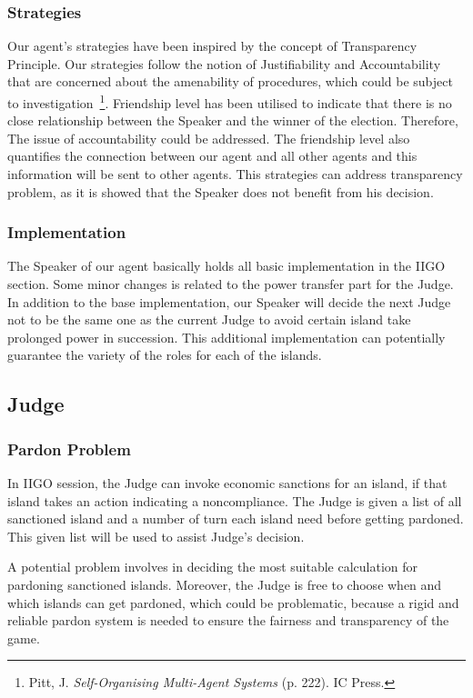 \subsubsection{Strategies} \label{subsubsec:Team6_Speaker:Strategies}
Our agent's strategies have been inspired by the concept of Transparency Principle. Our strategies follow the notion of Justifiability and Accountability that are concerned about the amenability of procedures, which could be subject to investigation~\footnote{Pitt, J. \textit{Self-Organising Multi-Agent Systems} (p. 222). IC Press.}. Friendship level has been utilised to indicate that there is no close relationship between the Speaker and the winner of the election. Therefore, The issue of accountability could be addressed. The friendship level also quantifies the connection between our agent and all other agents and this information will be sent to other agents. This strategies can address transparency problem, as it is showed that the Speaker does not benefit from his decision.

\subsubsection{Implementation} \label{subsubsec:Team6_Speaker:Implementation}
The Speaker of our agent basically holds all basic implementation in the IIGO section. Some minor changes is related to the power transfer part for the Judge. In addition to the base implementation, our Speaker will decide the next Judge not to be the same one as the current Judge to avoid certain island take prolonged power in succession. This additional implementation can potentially guarantee the variety of the roles for each of the islands.

\subsection{Judge} \label{subsec:Team6_Judge}
\subsubsection{Pardon Problem} \label{subsubsec:Team6_Judge:Problem}
In IIGO session, the Judge can invoke economic sanctions for an island, if that island takes an action indicating a noncompliance. The Judge is given a list of all sanctioned island and a number of turn each island need before getting pardoned. This given list will be used to assist Judge's decision.

A potential problem involves in deciding the most suitable calculation for pardoning sanctioned islands. Moreover, the Judge is free to choose when and which islands can get pardoned, which could be problematic, because a rigid and reliable pardon system is needed to ensure the fairness and transparency of the game.

